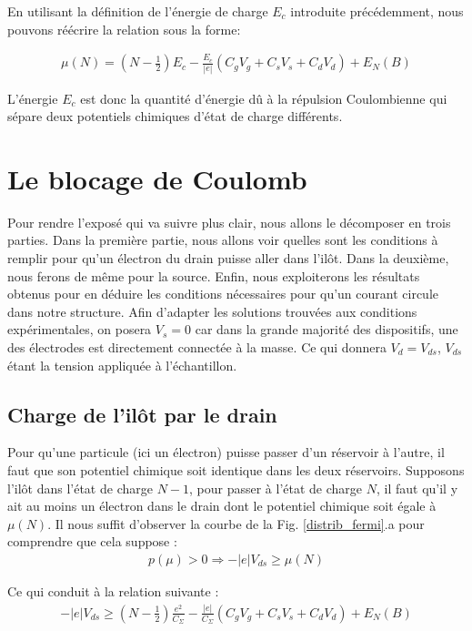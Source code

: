 En utilisant la définition de l'énergie de charge $E_c$ introduite précédemment, nous pouvons réécrire la relation sous la forme:

\begin{eqnarray}
\mu(N) = (N-\frac{1}{2})E_c
- 
\frac{E_c}{|e|}(C_gV_g + C_sV_s + C_dV_d)
+
E_N(B)
\label{pot_chim}
\end{eqnarray}

L'énergie $E_c$ est donc la quantité d'énergie d\^u à la répulsion Coulombienne qui sépare deux potentiels chimiques d'état de charge différents.


\section{Le blocage de Coulomb}
Pour rendre l'exposé qui va suivre plus clair, nous allons le décomposer en trois parties. Dans la première partie, nous allons voir quelles sont les conditions à remplir pour qu'un électron du drain puisse aller dans l'il\^ot. Dans la deuxième, nous ferons de m\^eme pour la source. Enfin, nous exploiterons les résultats obtenus pour en déduire les conditions nécessaires pour qu'un courant circule dans notre structure. Afin d'adapter les solutions trouvées aux conditions expérimentales, on posera $V_s = 0$ car dans la grande majorité des dispositifs, une des électrodes est directement connectée à la masse. Ce qui donnera $V_d=V_{ds}$, $V_{ds}$ étant la tension appliquée à l'échantillon.

\subsection{Charge de l'il\^ot par le drain}
Pour qu'une particule (ici un électron) puisse passer d'un réservoir à l'autre, il faut que son potentiel chimique soit identique dans les deux réservoirs. Supposons l'il\^ot dans l'état de charge $N-1$, pour passer à l'état de charge $N$, il faut qu'il y ait au moins un électron dans le drain dont le potentiel chimique soit égale à $\mu(N)$. Il nous suffit d'observer la courbe de la Fig. \ref{distrib_fermi}.a pour comprendre que cela suppose :
\begin{eqnarray}
p(\mu) > 0 \Longrightarrow  -|e|V_{ds} \geq \mu(N) \nonumber
\end{eqnarray}

Ce qui conduit à la relation suivante :
\begin{eqnarray}
-|e|V_{ds} \geq (N-\frac{1}{2})\frac{e^2}{C_{\Sigma}}
-
\frac{|e|}{C_{\Sigma}}(C_gV_g + C_sV_s + C_dV_d)
+
E_N(B) \nonumber
\end{eqnarray}

